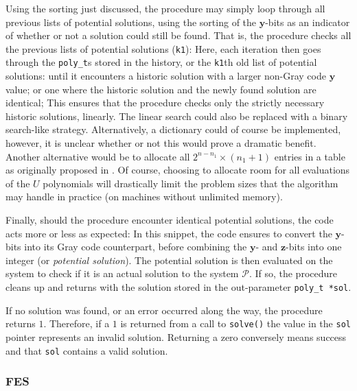 Using the sorting just discussed, the procedure may simply loop through all previous lists of potential solutions, using the sorting of the $\mathbf{y}$-bits as an indicator of whether or not a solution could still be found. That is, the procedure checks all the previous lists of potential solutions (\texttt{k1}):
Here, each iteration then goes through the \texttt{poly\_t}s stored in the history, or the \texttt{k1}th old list of potential solutions:
until it encounters a historic solution with a larger non-Gray code $\mathbf{y}$ value; 
or one where the historic solution and the newly found solution are identical;
This ensures that the procedure checks only the strictly necessary historic solutions, linearly. The linear search could also be replaced with a binary search-like strategy. Alternatively, a dictionary could of course be implemented, however, it is unclear whether or not this would prove a dramatic benefit. Another alternative would be to allocate all $2^{n - n_1} \times (n_1 + 1)$ entries in a table as originally proposed in \cite{eurocrypt-2021-30841}. Of course, choosing to allocate room for all evaluations of the $U$ polynomials will drastically limit the problem sizes that the algorithm may handle in practice (on machines without unlimited memory).

Finally, should the procedure encounter identical potential solutions, the code acts more or less as expected:
In this snippet, the code ensures to convert the $\mathbf{y}$-bits into its Gray code counterpart, before combining the $\mathbf{y}$- and $\mathbf{z}$-bits into one integer (or \textit{potential solution}). The potential solution is then evaluated on the system to check if it is an actual solution to the system $\mathcal{P}$. If so, the procedure cleans up and returns with the solution stored in the out-parameter \texttt{poly\_t *sol}.

If no solution was found, or an error occurred along the way, the procedure returns $1$. Therefore, if a $1$ is returned from a call to \texttt{solve()} the value in the \texttt{sol} pointer represents an invalid solution. Returning a zero conversely means success and that \texttt{sol} contains a valid solution.

\subsubsection{FES} \label{sec:impl:c:fes}
